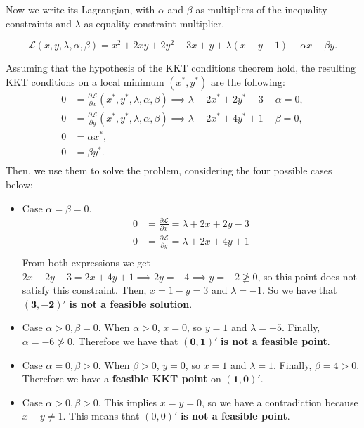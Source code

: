 \documentclass[12pt]{scrartcl}
\begin{document}
Now we write its Lagrangian, with $\alpha$ and $\beta$ as multipliers of the inequality constraints and $\lambda$ as equality constraint multiplier. 


\begin{equation*}
    \mathcal{L}(x, y, \lambda, \alpha, \beta) = x^2 + 2xy + 2y^2 -3x + y + \lambda(x + y -1) - \alpha x - \beta y.
\end{equation*}

\vspace{0.5em}

Assuming that the hypothesis of the KKT conditions theorem hold, the resulting KKT conditions on a local minimum $(x^\ast, y^\ast)$ are the following:
\begin{align*}
    0 &= \frac{\partial \mathcal{L}}{\partial x} (x^\ast, y^\ast, \lambda, \alpha, \beta) \implies \lambda + 2x^\ast + 2y^\ast -3 - \alpha = 0,\\
    0 &= \frac{\partial \mathcal{L}}{\partial y} (x^\ast, y^\ast, \lambda, \alpha, \beta) \implies \lambda + 2x^\ast + 4y^\ast + 1 - \beta = 0,\\
    0 &= \alpha x^\ast ,\\
    0 &= \beta y^\ast .\\
\end{align*}
Then, we use them to solve the problem, considering the four possible cases below:
\begin{itemize}
    \item Case $\alpha = \beta = 0$.
    \begin{align*}
        0 &= \frac{\partial \mathcal{L}}{\partial x} = \lambda + 2x + 2y -3 \\
        0 &= \frac{\partial \mathcal{L}}{\partial y} = \lambda + 2x + 4y + 1 \\
    \end{align*}
    From both expressions we get $2x + 2y -3 = 2x + 4y +1 \implies 2y = -4 \implies y = -2 \ngeq 0$, so this point does not satisfy this constraint. Then, $x = 1-y = 3$ and $\lambda=-1$. So we have that $\mathbf{(3, -2)'}$ \textbf{is not a feasible solution}.
    \item Case $\alpha > 0, \beta = 0$.
    When $\alpha > 0$, $x=0$, so $y=1$ and $\lambda=-5$. Finally, $\alpha = -6 \ngtr 0$. Therefore we have that $\mathbf{(0, 1)'}$ \textbf{is not a feasible point}.
    \item Case $\alpha = 0, \beta > 0$.
    When $\beta > 0$, $y=0$, so $x=1$ and $\lambda=1$. Finally, $\beta = 4 > 0$. Therefore we have a \textbf{feasible KKT point} on $\mathbf{(1, 0)'}$.
    \item Case $\alpha > 0, \beta > 0$.
    This implies $x=y=0$, so we have a contradiction because $x + y \neq 1$. This means that $(0,0)'$ \textbf{is not a feasible point}.
\end{itemize}
\end{document}

